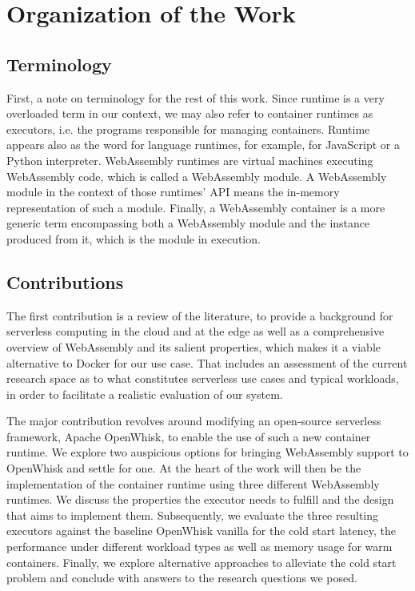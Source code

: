 \section{Organization of the Work}

\subsection{Terminology}

First, a note on terminology for the rest of this work. Since runtime is a very overloaded term in our context, we may also refer to container runtimes as executors, i.e. the programs responsible for managing containers. Runtime appears also as the word for language runtimes, for example,  for JavaScript or a Python interpreter.
WebAssembly runtimes are virtual machines executing WebAssembly code, which is called a WebAssembly module. A WebAssembly module in the context of those runtimes' API means the in-memory representation of such a module. Finally, a WebAssembly container is a more generic term encompassing both a WebAssembly module and the instance produced from it, which is the module in execution.

\subsection{Contributions}

The first contribution is a review of the literature, to provide a background for serverless computing in the cloud and at the edge as well as a comprehensive overview of WebAssembly and its salient properties, which makes it a viable alternative to Docker for our use case. That includes an assessment of the current research space as to what constitutes serverless use cases and typical workloads, in order to facilitate a realistic evaluation of our system.

The major contribution revolves around modifying an open-source serverless framework, Apache OpenWhisk, to enable the use of such a new container runtime. We explore two auspicious options for bringing WebAssembly support to OpenWhisk and settle for one. At the heart of the work will then be the implementation of the container runtime using three different WebAssembly runtimes. We discuss the properties the executor needs to fulfill and the design that aims to implement them. Subsequently, we evaluate the three resulting executors against the baseline OpenWhisk vanilla for the cold start latency, the performance under different workload types as well as memory usage for warm containers. Finally, we explore alternative approaches to alleviate the cold start problem and conclude with answers to the research questions we posed.

